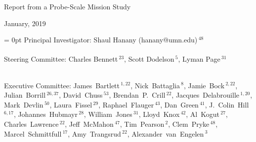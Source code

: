 \documentclass[PICOReport.tex]{subfiles}
\begin{document}
%
%
%
%
\LARGE{ \centerline{Report from a Probe-Scale Mission Study}}
\Large{ \centerline{January, 2019 }}
\vspace{10pt}

\parindent = 0pt
\small{
Principal Investigator: Shaul Hanany (hanany@umn.edu)\,$^{48}$ } \\
\vspace{-6pt} \\
\small{
Steering Committee: Charles Bennett\,$^{23}$, Scott Dodelson\,$^{5}$, Lyman Page\,$^{31}$ } \\
\vspace{-6pt} \\
\small{
\raggedright
Executive Committee:
James~Bartlett\,$^{1,22}$,
Nick~Battaglia\,$^{8}$,
Jamie~Bock\,$^{2,22}$,
Julian~Borrill\,$^{26,37}$,
David~Chuss\,$^{53}$,
Brendan~P.~Crill\,$^{22}$,
Jacques~Delabrouille\,$^{1,20}$,
Mark~Devlin\,$^{50}$,
Laura~Fissel\,$^{29}$,
Raphael~Flauger\,$^{43}$,
Dan~Green\,$^{41}$,
J.~Colin~Hill\,$^{6,17}$,
Johannes~Hubmayr\,$^{28}$,
William~Jones\,$^{31}$,
Lloyd~Knox\,$^{42}$,
Al~Kogut\,$^{27}$,
Charles~Lawrence\,$^{22}$,
Jeff~McMahon\,$^{47}$,
Tim~Pearson\,$^{2}$,
Clem~Pryke\,$^{48}$,
Marcel~Schmittfull\,$^{17}$,
Amy~Trangsrud\,$^{22}$,
Alexander~van~Engelen\,$^3$ 
\\
}
\label{authorlist}

\vspace{9pt}
\end{document}
